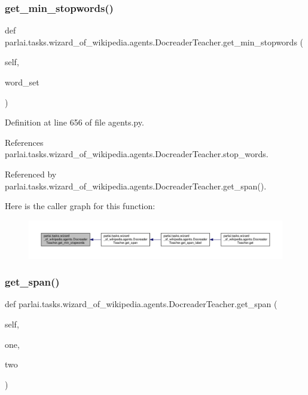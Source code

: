 \subsubsection{\texorpdfstring{get\+\_\+min\+\_\+stopwords()}{get\_min\_stopwords()}}
{\footnotesize\ttfamily def parlai.\+tasks.\+wizard\+\_\+of\+\_\+wikipedia.\+agents.\+Docreader\+Teacher.\+get\+\_\+min\+\_\+stopwords (\begin{DoxyParamCaption}\item[{}]{self,  }\item[{}]{word\+\_\+set }\end{DoxyParamCaption})}



Definition at line 656 of file agents.\+py.



References parlai.\+tasks.\+wizard\+\_\+of\+\_\+wikipedia.\+agents.\+Docreader\+Teacher.\+stop\+\_\+words.



Referenced by parlai.\+tasks.\+wizard\+\_\+of\+\_\+wikipedia.\+agents.\+Docreader\+Teacher.\+get\+\_\+span().

Here is the caller graph for this function\+:
\nopagebreak
\begin{figure}[H]
\begin{center}
\leavevmode
\includegraphics[width=350pt]{classparlai_1_1tasks_1_1wizard__of__wikipedia_1_1agents_1_1DocreaderTeacher_a5dba8f178a059e0daae7fec42bfc4330_icgraph}
\end{center}
\end{figure}
\mbox{\label{classparlai_1_1tasks_1_1wizard__of__wikipedia_1_1agents_1_1DocreaderTeacher_a4711260e72f13e7aab1f621030762847}} 
\subsubsection{\texorpdfstring{get\+\_\+span()}{get\_span()}}
{\footnotesize\ttfamily def parlai.\+tasks.\+wizard\+\_\+of\+\_\+wikipedia.\+agents.\+Docreader\+Teacher.\+get\+\_\+span (\begin{DoxyParamCaption}\item[{}]{self,  }\item[{}]{one,  }\item[{}]{two }\end{DoxyParamCaption})}



